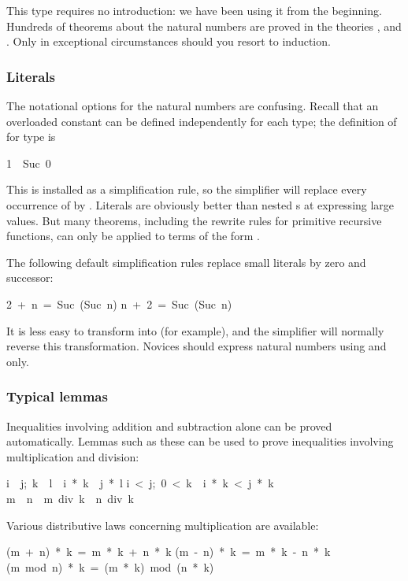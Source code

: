 %
This type requires no introduction: we have been using it from the
beginning.  Hundreds of theorems about the natural numbers are
proved in the theories ,  and .  Only
in exceptional circumstances should you resort to induction.

\subsubsection{Literals}
%
The notational options for the natural  numbers are confusing.  Recall that an
overloaded constant can be defined independently for each type; the definition
of  for type  is
\begin{isabelle}
1\ \isasymequiv\ Suc\ 0
\end{isabelle}
This is installed as a simplification rule, so the simplifier will replace
every occurrence of  by .  Literals are obviously
better than nested s at expressing large values.  But many theorems,
including the rewrite rules for primitive recursive functions, can only be
applied to terms of the form .

The following default  simplification rules replace
small literals by zero and successor: 
\begin{isabelle}
2\ +\ n\ =\ Suc\ (Suc\ n)
\isanewline
n\ +\ 2\ =\ Suc\ (Suc\ n)
\end{isabelle}
It is less easy to transform  into  (for example), and
the simplifier will normally reverse this transformation.  Novices should
express natural numbers using  and  only.

\subsubsection{Typical lemmas}
Inequalities involving addition and subtraction alone can be proved
automatically.  Lemmas such as these can be used to prove inequalities
involving multiplication and division:
\begin{isabelle}
\isasymlbrakk i\ \isasymle \ j;\ k\ \isasymle \ l\isasymrbrakk \ \isasymLongrightarrow \ i\ *\ k\ \isasymle \ j\ *\ l%
\isanewline
\isasymlbrakk i\ <\ j;\ 0\ <\ k\isasymrbrakk \ \isasymLongrightarrow \ i\
*\ k\ <\ j\ *\ k%
\isanewline
m\ \isasymle \ n\ \isasymLongrightarrow \ m\ div\ k\ \isasymle \ n\ div\ k%
\rulename{div_le_mono}
\end{isabelle}
%
Various distributive laws concerning multiplication are available:
\begin{isabelle}
(m\ +\ n)\ *\ k\ =\ m\ *\ k\ +\ n\ *\ k%
\isanewline
(m\ -\ n)\ *\ k\ =\ m\ *\ k\ -\ n\ *\ k%
\isanewline
(m\ mod\ n)\ *\ k\ =\ (m\ *\ k)\ mod\ (n\ *\ k)
\end{isabelle}

